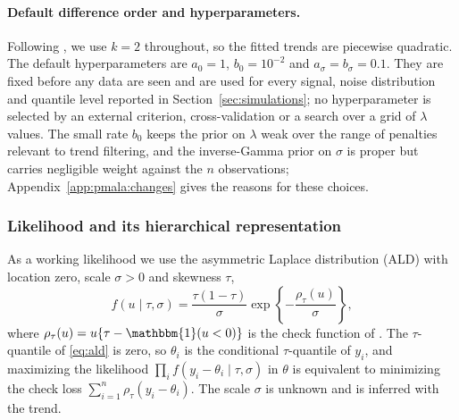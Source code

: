 \paragraph{Default difference order and hyperparameters.} Following \citet{brantley2020baseline}, we use $k = 2$ throughout, so the fitted trends are piecewise quadratic. The default hyperparameters are $a_0 = 1$, $b_0 = 10^{-2}$ and $a_\sigma = b_\sigma = 0.1$. They are fixed before any data are seen and are used for every signal, noise distribution and quantile level reported in Section~\ref{sec:simulations}; no hyperparameter is selected by an external criterion, cross-validation or a search over a grid of $\lambda$ values. The small rate $b_0$ keeps the prior on $\lambda$ weak over the range of penalties relevant to trend filtering, and the inverse-Gamma prior on $\sigma$ is proper but carries negligible weight against the $n$ observations; Appendix~\ref{app:pmala:changes} gives the reasons for these choices.

\subsubsection{Likelihood and its hierarchical representation}

As a working likelihood we use the asymmetric Laplace distribution (ALD) with location zero, scale $\sigma > 0$ and skewness $\tau$,
\begin{equation}
    f(u \mid \tau, \sigma) = \frac{\tau(1-\tau)}{\sigma}
    \exp\!\left\{-\frac{\rho_\tau(u)}{\sigma}\right\},
    \label{eq:ald}
\end{equation}
where $\rho_\tau(u) = u\{\tau - \mathbbm{1}(u < 0)\}$ is the check function of \citet{koenker1978regression}. The $\tau$-quantile of \eqref{eq:ald} is zero, so $\theta_i$ is the conditional $\tau$-quantile of $y_i$, and maximizing the likelihood $\prod_i f(y_i - \theta_i \mid \tau, \sigma)$ in $\theta$ is equivalent to minimizing the check loss $\sum_{i=1}^n \rho_\tau(y_i-\theta_i)$. The scale $\sigma$ is unknown and is inferred with the trend.

